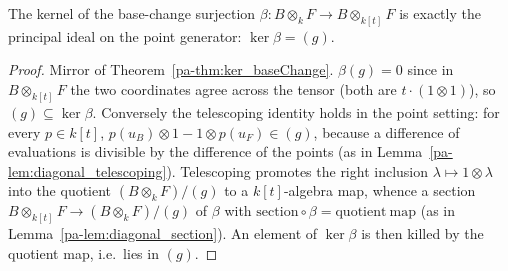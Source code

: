 \begin{theorem}
  \label{pa-thm:ker_pointBaseChange}
  \leanok

  The kernel of the base-change surjection
  \(\beta \colon B \otimes_k F \to B \otimes_{k[t]} F\) is exactly the principal ideal on
  the point generator: \(\ker \beta = (g)\).
\end{theorem}
\begin{proof}
  \leanok
  Mirror of Theorem~\ref{pa-thm:ker_baseChange}. \(\beta(g) = 0\) since in
  \(B \otimes_{k[t]} F\) the two coordinates agree across the tensor (both are
  \(t \cdot (1 \otimes 1)\)), so \((g) \subseteq \ker\beta\). Conversely the telescoping
  identity holds in the point setting: for every \(p \in k[t]\),
  \(p(u_B) \otimes 1 - 1 \otimes p(u_F) \in (g)\), because a difference of evaluations is
  divisible by the difference of the points (as in Lemma~\ref{pa-lem:diagonal_telescoping}).
  Telescoping promotes the right inclusion \(\lambda \mapsto 1 \otimes \lambda\) into the
  quotient \((B \otimes_k F)/(g)\) to a \(k[t]\)-algebra map, whence a section
  \(B \otimes_{k[t]} F \to (B \otimes_k F)/(g)\) of \(\beta\) with
  \(\mathrm{section} \circ \beta = \mathrm{quotient\ map}\) (as in
  Lemma~\ref{pa-lem:diagonal_section}). An element of \(\ker\beta\) is then killed by the
  quotient map, i.e.\ lies in \((g)\).
\end{proof}

